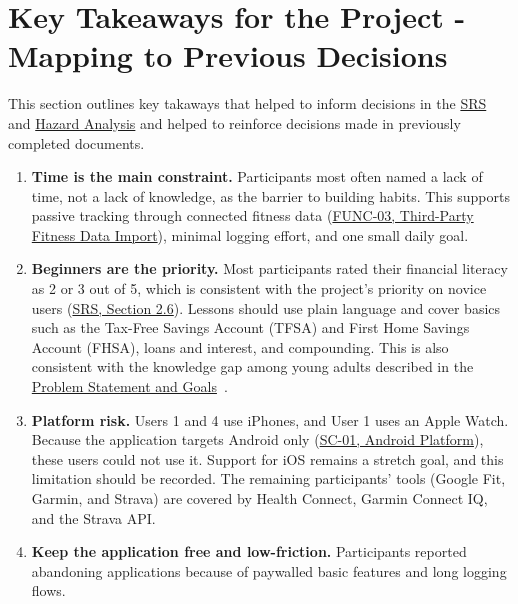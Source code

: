 \documentclass[12pt]{article}
\begin{document}
\section{Key Takeaways for the Project - Mapping to Previous Decisions}
This section outlines key takaways that helped to inform decisions in the \href{https://github.com/arjunkarthik123/fitness-finance-application/blob/main/pdfs/SRS-Volere/SRS.pdf}{SRS} and \href{https://github.com/arjunkarthik123/fitness-finance-application/blob/main/pdfs/HazardAnalysis/HazardAnalysis.pdf}{Hazard Analysis} and helped to reinforce decisions made in previously completed documents.
\begin{enumerate}
\item \textbf{Time is the main constraint.} Participants most often named a lack of time, not a lack of knowledge, as the barrier to building habits. This supports passive tracking through connected fitness data (\href{https://github.com/arjunkarthik123/fitness-finance-application/blob/main/pdfs/SRS-Volere/SRS.pdf}{FUNC-03, Third-Party Fitness Data Import}), minimal logging effort, and one small daily goal.
\item \textbf{Beginners are the priority.} Most participants rated their financial literacy as 2 or 3 out of 5, which is consistent with the project's priority on novice users (\href{https://github.com/arjunkarthik123/fitness-finance-application/blob/main/pdfs/SRS-Volere/SRS.pdf}{SRS, Section 2.6}). Lessons should use plain language and cover basics such as the Tax-Free Savings Account (TFSA) and First Home Savings Account (FHSA), loans and interest, and compounding. This is also consistent with the knowledge gap among young adults described in the \href{https://github.com/arjunkarthik123/fitness-finance-application/blob/main/pdfs/ProblemStatementAndGoals/ProblemStatement.pdf}{Problem Statement and Goals}~\cite{boisclair2017}.
\item \textbf{Platform risk.} Users 1 and 4 use iPhones, and User 1 uses an Apple Watch. Because the application targets Android only (\href{https://github.com/arjunkarthik123/fitness-finance-application/blob/main/pdfs/SRS-Volere/SRS.pdf}{SC-01, Android Platform}), these users could not use it. Support for iOS remains a stretch goal, and this limitation should be recorded. The remaining participants' tools (Google Fit, Garmin, and Strava) are covered by Health Connect, Garmin Connect IQ, and the Strava API.
\item \textbf{Keep the application free and low-friction.} Participants reported abandoning applications because of paywalled basic features and long logging flows.

\end{enumerate}
\end{document}
